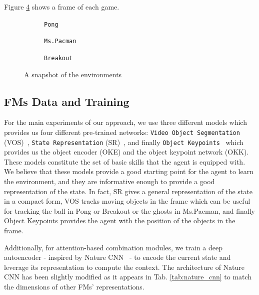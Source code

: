 Figure \ref{fig:environemnts} shows a frame of each game.
\begin{figure}[ht]
    \centering
    \begin{subfigure}[b]{0.30\textwidth}
        \centering
        \fbox{\rule[-.5cm]{0cm}{4cm} \rule[-.5cm]{4cm}{0cm}}
        \caption{\texttt{Pong}}
        \label{fig:pong_env}
    \end{subfigure}
    \hfill
    \begin{subfigure}[b]{0.30\textwidth}
        \centering
        \fbox{\rule[-.5cm]{0cm}{4cm} \rule[-.5cm]{4cm}{0cm}}
        \caption{\texttt{Ms.Pacman}}
        \label{fig:mspacman_env}
    \end{subfigure}
    \hfill
    \begin{subfigure}[b]{0.30\textwidth}
        \centering
        \fbox{\rule[-.5cm]{0cm}{4cm} \rule[-.5cm]{4cm}{0cm}}
        \caption{\texttt{Breakout}}
        \label{fig:breakout_env}
    \end{subfigure}
    \caption{A snapshot of the environments}
    \label{fig:environemnts}
\end{figure}


\subsection{FMs Data and Training}\label{subsec:fms-data-and-training}
For the main experiments of our approach, we use three different models which provides us four different pre-trained networks: \texttt{Video Object Segmentation} (VOS)~\citep{goel2018unsupervised}, \texttt{State Representation} (SR)~\citep{anand2019unsupervised}, and finally \texttt{Object Keypoints}~\citep{kulkarni2019unsupervised} which provides us the object encoder (OKE) and the object keypoint network (OKK).
These models constitute the set of basic skills that the agent is equipped with.
We believe that these models provide a good starting point for the agent to learn the environment, and they are informative enough to provide a good representation of the state.
In fact, SR gives a general representation of the state in a compact form, VOS tracks moving objects in the frame which can be useful for tracking the ball in Pong or Breakout or the ghosts in Ms.Pacman, and finally Object Keypoints provides the agent with the position of the objects in the frame.

Additionally, for attention-based combination modules, we train a deep autoencoder - inspired by Nature CNN~\citep{mnih2015human} - to encode the current state and leverage its representation to compute the context.
The architecture of Nature CNN has been slightly modified as it appears in Tab. \ref{tab:nature_cnn} to
match the dimensions of other FMs' representations.

